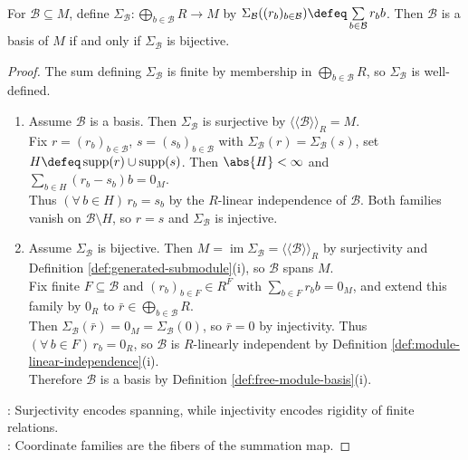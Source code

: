 \begin{theorem} \label{thm:module-basis-unique-coordinates} \\
For $\mathcal{B}\subseteq M$, define $\Sigma_{\mathcal{B}}:\bigoplus\limits_{b\in\mathcal{B}}R\to M$ by $\Sigma_{\mathcal{B}}((r_b)_{b\in\mathcal{B}})\defeq\sum\limits_{b\in\mathcal{B}}r_bb$. Then $\mathcal{B}$ is a basis of $M$ if and only if $\Sigma_{\mathcal{B}}$ is bijective.
\begin{proof}
The sum defining $\Sigma_{\mathcal{B}}$ is finite by membership in $\bigoplus\limits_{b\in\mathcal{B}}R$, so $\Sigma_{\mathcal{B}}$ is well-defined.
\begin{enumerate}[label=\roman*.]
\setlength{\itemsep}{0pt}
\item[$(\Rightarrow)$] Assume $\mathcal{B}$ is a basis. Then $\Sigma_{\mathcal{B}}$ is surjective by $\langle\!\langle\mathcal{B}\rangle\!\rangle_R=M$.\\
Fix $r=(r_b)_{b\in\mathcal{B}}$, $s=(s_b)_{b\in\mathcal{B}}$ with $\Sigma_{\mathcal{B}}(r)=\Sigma_{\mathcal{B}}(s)$, set $H\defeq\operatorname{supp}(r)\cup\operatorname{supp}(s)$. Then $\abs{H}<\infty$ and $\sum\limits_{b\in H}(r_b-s_b)b=0_M$.\\
Thus $(\forall\,b\in H)\,r_b=s_b$ by the $R$-linear independence of $\mathcal{B}$. Both families vanish on $\mathcal{B}\setminus H$, so $r=s$ and $\Sigma_{\mathcal{B}}$ is injective.
\item[$(\Leftarrow)$] Assume $\Sigma_{\mathcal{B}}$ is bijective. Then $M=\operatorname{im}\Sigma_{\mathcal{B}}=\langle\!\langle\mathcal{B}\rangle\!\rangle_R$ by surjectivity and Definition \ref{def:generated-submodule}(i), so $\mathcal{B}$ spans $M$.\\
Fix finite $F\subseteq\mathcal{B}$ and $(r_b)_{b\in F}\in R^F$ with $\sum\limits_{b\in F}r_bb=0_M$, and extend this family by $0_R$ to $\bar r\in\bigoplus\limits_{b\in\mathcal{B}}R$.\\
Then $\Sigma_{\mathcal{B}}(\bar r)=0_M=\Sigma_{\mathcal{B}}(0)$, so $\bar r=0$ by injectivity. Thus $(\forall\,b\in F)\,r_b=0_R$, so $\mathcal{B}$ is $R$-linearly independent by Definition \ref{def:module-linear-independence}(i).\\
Therefore $\mathcal{B}$ is a basis by Definition \ref{def:free-module-basis}(i).
\end{enumerate}
: Surjectivity encodes spanning, while injectivity encodes rigidity of finite relations.\\
: Coordinate families are the fibers of the summation map.
\end{proof}
\end{theorem}

